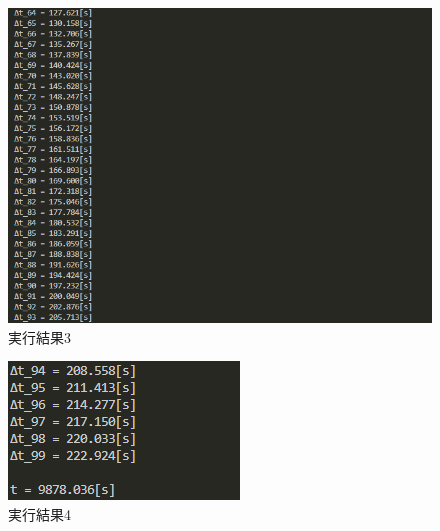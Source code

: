 \begin{figure}[H]
  \begin{center}
    \includegraphics[width=.8\linewidth]{img/k4_3.png}
    \caption{実行結果3}
    \label{im3}
  \end{center}
\end{figure}
\begin{figure}[H]
  \begin{center}
    \includegraphics[width=.8\linewidth]{img/k4_4.png}
    \caption{実行結果4}
    \label{im4}
  \end{center}
\end{figure}